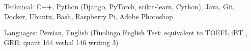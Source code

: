 

\begin{cvskills}

  \cvskill
    {Technical:}
    {C++, Python (Django, PyTorch, scikit-learn, Cython), Java, Git, Docker, Ubuntu, Bash, Raspberry Pi, Adobe Photoshop}




  \cvskill
    {Languages:}
    {Persian, English (Duolingo English Test:  equivalent to TOEFL iBT  , GRE: quant 164 verbal 146 writing 3)} %

\end{cvskills}
